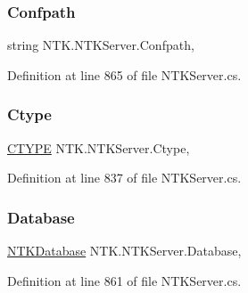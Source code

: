 \subsubsection{\texorpdfstring{Confpath}{Confpath}}
{\footnotesize\ttfamily string N\+T\+K.\+N\+T\+K\+Server.\+Confpath\hspace{0.3cm}{\ttfamily [get]}, {\ttfamily [set]}}







Definition at line 865 of file N\+T\+K\+Server.\+cs.

\mbox{\label{class_n_t_k_1_1_n_t_k_server_aa40f4790ecbcdf3f944af7bc00075914}} 
\subsubsection{\texorpdfstring{Ctype}{Ctype}}
{\footnotesize\ttfamily \mbox{\hyperlink{namespace_n_t_k_a8fa28c7c4270bbb81ee96b4f632fdbec}{C\+T\+Y\+PE}} N\+T\+K.\+N\+T\+K\+Server.\+Ctype\hspace{0.3cm}{\ttfamily [get]}, {\ttfamily [set]}}







Definition at line 837 of file N\+T\+K\+Server.\+cs.

\mbox{\label{class_n_t_k_1_1_n_t_k_server_ae590145453fd070aa1ec1d13172b4222}} 
\subsubsection{\texorpdfstring{Database}{Database}}
{\footnotesize\ttfamily \mbox{\hyperlink{class_n_t_k_1_1_database_1_1_n_t_k_database}{N\+T\+K\+Database}} N\+T\+K.\+N\+T\+K\+Server.\+Database\hspace{0.3cm}{\ttfamily [get]}, {\ttfamily [set]}}







Definition at line 861 of file N\+T\+K\+Server.\+cs.

\mbox{\label{class_n_t_k_1_1_n_t_k_server_a3178c120d84bb1bcdc75b04fa5d0c94c}} 
